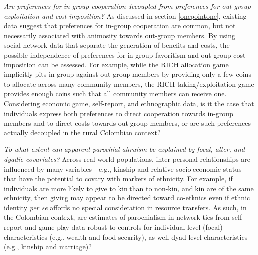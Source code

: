 \documentclass[bibauthoryear]{aa}
\begin{document}
\begin{enumerate*}[label={Q(\arabic*)},font={\color{blue!50!black}\bfseries}]
\item \label{q4} \emph{Are preferences for in-group cooperation decoupled from preferences for out-group exploitation and cost imposition?} As discussed in section \ref{onepointone}, existing data suggest that preferences for in-group cooperation are common, but  not necessarily associated with animosity towards out-group members. By using social network data that separate the generation of benefits and costs, the possible independence of preferences for in-group favoritism and out-group cost imposition can be assessed. For example, while the RICH allocation game implicitly pits in-group against out-group members by providing only a few coins to allocate across many community members, the RICH taking/exploitation game provides enough coins such that all community members can receive one. %
Considering economic game, self-report, and ethnographic data, is it the case that individuals express both preferences to direct cooperation towards in-group members and to direct costs towards out-group members, or are such preferences actually decoupled in the rural Colombian context?
\\
\indent

\item \label{q5} \emph{To what extent can apparent parochial altruism be explained by focal, alter, and dyadic covariates?} %
Across real-world populations, inter-personal relationships are influenced by many variables---e.g., kinship and relative socio-economic status---that have the potential to covary with markers of ethnicity. For example, if individuals are more likely to give to kin than to non-kin, and kin are of the same ethnicity, then giving may appear to be directed toward co-ethnics even if ethnic identity \emph{per se} affords no special consideration in resource transfers. As such, in the Colombian context, are estimates of parochialism in network ties from self-report and game play data robust to controls for individual-level (focal) characteristics (e.g., wealth and food security), as well dyad-level characteristics (e.g., kinship and  marriage)? %

\end{enumerate*}
\end{document}
